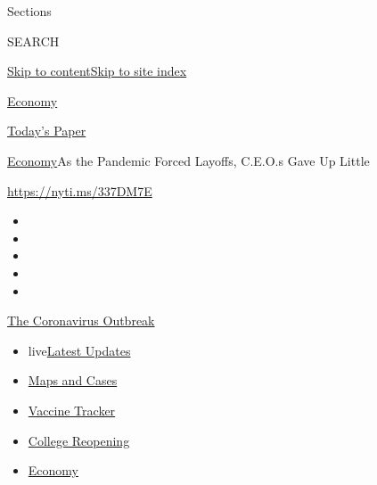 Sections

SEARCH

\protect\hyperlink{site-content}{Skip to
content}\protect\hyperlink{site-index}{Skip to site index}

\href{https://www.nytimes3xbfgragh.onion/section/business/economy}{Economy}

\href{https://myaccount.nytimes3xbfgragh.onion/auth/login?response_type=cookie\&client_id=vi}{}

\href{https://www.nytimes3xbfgragh.onion/section/todayspaper}{Today's
Paper}

\href{/section/business/economy}{Economy}\textbar{}As the Pandemic
Forced Layoffs, C.E.O.s Gave Up Little

\url{https://nyti.ms/337DM7E}

\begin{itemize}
\item
\item
\item
\item
\item
\end{itemize}

\href{https://www.nytimes3xbfgragh.onion/news-event/coronavirus?action=click\&pgtype=Article\&state=default\&region=TOP_BANNER\&context=storylines_menu}{The
Coronavirus Outbreak}

\begin{itemize}
\tightlist
\item
  live\href{https://www.nytimes3xbfgragh.onion/2020/08/03/world/coronavirus-covid-19.html?action=click\&pgtype=Article\&state=default\&region=TOP_BANNER\&context=storylines_menu}{Latest
  Updates}
\item
  \href{https://www.nytimes3xbfgragh.onion/interactive/2020/us/coronavirus-us-cases.html?action=click\&pgtype=Article\&state=default\&region=TOP_BANNER\&context=storylines_menu}{Maps
  and Cases}
\item
  \href{https://www.nytimes3xbfgragh.onion/interactive/2020/science/coronavirus-vaccine-tracker.html?action=click\&pgtype=Article\&state=default\&region=TOP_BANNER\&context=storylines_menu}{Vaccine
  Tracker}
\item
  \href{https://www.nytimes3xbfgragh.onion/2020/08/02/us/covid-college-reopening.html?action=click\&pgtype=Article\&state=default\&region=TOP_BANNER\&context=storylines_menu}{College
  Reopening}
\item
  \href{https://www.nytimes3xbfgragh.onion/live/2020/08/03/business/stock-market-today-coronavirus?action=click\&pgtype=Article\&state=default\&region=TOP_BANNER\&context=storylines_menu}{Economy}
\end{itemize}


